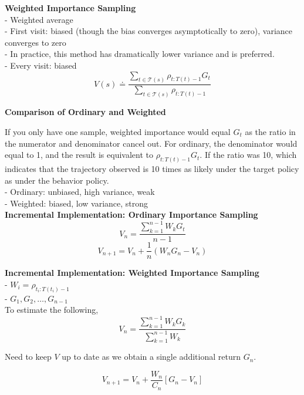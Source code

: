 \documentclass{article}
\begin{document}
\noindent
\textbf{Weighted Importance Sampling}\\
- Weighted average\\
- First visit: biased (though the bias converges asymptotically to zero), variance converges to zero\\
- In practice, this method has dramatically lower variance and is preferred.\\
- Every visit: biased
\begin{equation}
V(s) \doteq \frac{\sum_{t \in \mathcal{T}(s)} \rho_{t: T(t)-1} G_{t}}{\sum_{t \in \mathcal{T}(s)} \rho_{t: T(t)-1}}
\end{equation}

\noindent
\textbf{Comparison of Ordinary and Weighted}

\noindent
If you only have one sample, weighted importance would equal $G_{t}$ as the
ratio in the numerator and denominator cancel out. For ordinary, the denominator
would equal to 1, and the result is equivalent to $\rho_{t: T(t)-1} G_{t}$. If
the ratio was 10, which indicates that the trajectory observed is 10 times as
likely under the target policy as under the behavior policy.\\
- Ordinary: unbiased, high variance, weak\\
- Weighted: biased, low variance, strong\\

\noindent
\textbf{Incremental Implementation: Ordinary Importance Sampling}
\begin{equation}
V_{n}=\frac{\sum_{k=1}^{n-1} W_{k} G_{t}}{n-1}
\end{equation}
\begin{equation}
V_{n+1}=V_{n}+\frac{1}{n}\left(W_{n} G_{n}-V_{n}\right)
\end{equation}

\noindent
\textbf{Incremental Implementation: Weighted Importance Sampling}\\
- $W_{i}=\rho_{t_{i}: T\left(t_{i}\right)-1}$\\
- $G_{1}, G_{2}, \dots, G_{n-1}$\\

\noindent
To estimate the following, 
\begin{equation}
V_{n}=\frac{\sum_{k=1}^{n-1} W_{k} G_{k}}{\sum_{k=1}^{n-1} W_{k}}
\end{equation}

\noindent
Need to keep $V$ up to date as we obtain a single additional return $G_{n}$.

\begin{equation}
V_{n+1}=V_{n}+\frac{W_{n}}{C_{n}}\left[G_{n}-V_{n}\right]
\end{equation}
\end{document}
